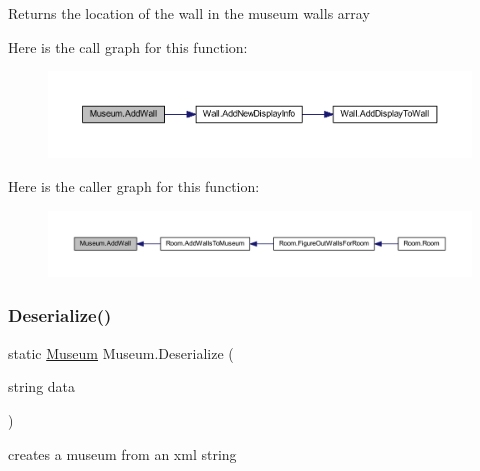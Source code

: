 \begin{DoxyReturn}{Returns}
the location of the wall in the museum walls array
\end{DoxyReturn}
Here is the call graph for this function\+:
\nopagebreak
\begin{figure}[H]
\begin{center}
\leavevmode
\includegraphics[width=350pt]{class_museum_a6e441db98efeaa314ae974222aea08e6_cgraph}
\end{center}
\end{figure}
Here is the caller graph for this function\+:
\nopagebreak
\begin{figure}[H]
\begin{center}
\leavevmode
\includegraphics[width=350pt]{class_museum_a6e441db98efeaa314ae974222aea08e6_icgraph}
\end{center}
\end{figure}
\mbox{\label{class_museum_a1b4fb627a19112e3ba3d25e8108de2c3}} 
\subsubsection{\texorpdfstring{Deserialize()}{Deserialize()}}
{\footnotesize\ttfamily static \mbox{\hyperlink{class_museum}{Museum}} Museum.\+Deserialize (\begin{DoxyParamCaption}\item[{string}]{data }\end{DoxyParamCaption})\hspace{0.3cm}{\ttfamily [static]}}



creates a museum from an xml string 


